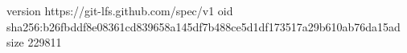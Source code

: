 version https://git-lfs.github.com/spec/v1
oid sha256:b26fbddf8e08361cd839658a145df7b488ce5d1df173517a29b610ab76da15ad
size 229811
